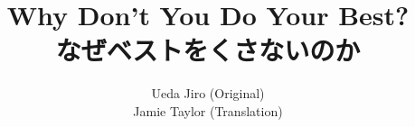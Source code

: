 \documentclass[paper=a4,fontsize=11pt]{report}	 	%
\begin{document}
\begin{CJK}{UTF8}{goth}								%


\renewcommand\rubysep{-0.1ex}

\title{Why Don't You Do Your Best?\\なぜベストをくさないのか}
\author{Ueda Jiro (Original)\\Jamie Taylor (Translation)}
\maketitle




\tableofcontents




\end{CJK}
\end{document}
